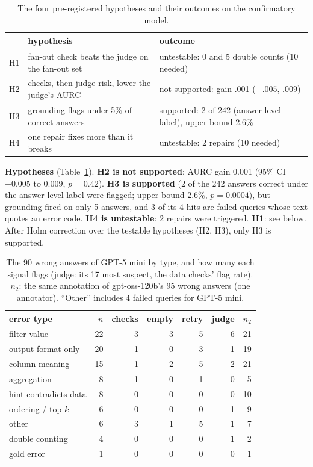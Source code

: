 \documentclass[conference]{IEEEtran}
\begin{document}
\begin{table}[t]
\centering\footnotesize
\setlength{\tabcolsep}{3pt}
\begin{tabular}{@{}lp{36mm}p{38mm}@{}}
\toprule
 & hypothesis & outcome \\
\midrule
H1 & fan-out check beats the judge on the fan-out set & untestable: 0 and 5 double counts (10 needed) \\
H2 & checks, then judge risk, lower the judge's AURC & not supported: gain .001 ($-.005$, $.009$) \\
H3 & grounding flags under 5\% of correct answers & supported: 2 of 242 (answer-level label), upper bound 2.6\% \\
H4 & one repair fixes more than it breaks & untestable: 2 repairs (10 needed) \\
\bottomrule
\end{tabular}
\caption{The four pre-registered hypotheses and their outcomes on the confirmatory model.}
\label{tab:hyp}
\end{table}

\textbf{Hypotheses} (Table~\ref{tab:hyp}). \textbf{H2 is not supported}: AURC gain 0.001 (95\% CI $-0.005$ to $0.009$,
$p=0.42$). \textbf{H3 is supported} (2 of the 242 answers correct under the answer-level label were flagged; upper bound 2.6\%,
$p=0.0004$), but grounding fired on only 5 answers, and 3 of its 4 hits are failed queries whose text
quotes an error code. \textbf{H4 is untestable}: 2 repairs were triggered. \textbf{H1}: see below.
After Holm correction over the testable hypotheses (H2, H3), only H3 is supported.

\begin{table}[t]
\centering\small
\setlength{\tabcolsep}{3pt}
\begin{tabular}{lrrrrrr}
\toprule
error type & $n$ & checks & empty & retry & judge & $n_2$ \\
\midrule
filter value & 22 & 3 & 3 & 5 & 6 & 21 \\
output format only & 20 & 1 & 0 & 3 & 1 & 19 \\
column meaning & 15 & 1 & 2 & 5 & 2 & 21 \\
aggregation & 8 & 1 & 0 & 1 & 0 & 5 \\
hint contradicts data & 8 & 0 & 0 & 0 & 0 & 10 \\
ordering / top-$k$ & 6 & 0 & 0 & 0 & 1 & 9 \\
other & 6 & 3 & 1 & 5 & 1 & 7 \\
double counting & 4 & 0 & 0 & 0 & 1 & 2 \\
gold error & 1 & 0 & 0 & 0 & 0 & 1 \\
\bottomrule
\end{tabular}
\caption{The 90 wrong answers of GPT-5 mini by type, and how many each signal flags (judge: its 17 most
suspect, the data checks' flag rate). $n_2$: the same annotation of gpt-oss-120b's 95 wrong answers
(one annotator). ``Other'' includes 4 failed queries for GPT-5 mini.}
\label{tab:errors}
\end{table}
\end{document}
